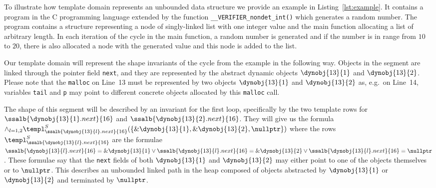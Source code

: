 {To illustrate how template domain represents an unbounded data structure we provide an example in Listing~\ref{lst:example}.
It contains a program in the C programming language
extended by the function \lstinline{__VERIFIER_nondet_int()} which generates a random number.
The program contains a structure representing a node of singly-linked list
with one integer value and the main function allocating a list of arbitrary length.
In each iteration of the cycle in the main function, a random number is generated and if the number is in range
from $10$ to $20$, there is also allocated a node with the generated value
and this node is added to the list.
%

Our template domain will represent the shape invariants of the cycle from the example in the following way.
Objects in the segment are linked through the pointer field \texttt{next}, and
they are represented by the abstract dynamic objects $\dynobj{13}{1}$ and
$\dynobj{13}{2}$.
Please note that the \texttt{malloc} on Line~13 must be represented by two objects
$\dynobj{13}{1}$ and $\dynobj{13}{2}$ as, e.g.\ on Line~14, variables
\texttt{tail} and \texttt{p} may point to different concrete objects allocated
by this \texttt{malloc} call.

%
The shape of this segment will be described by an
invariant for the first loop, specifically by the two template rows for
$\ssalb{\dynobj{13}{1}.next}{16}$ and $\ssalb{\dynobj{13}{2}.next}{16}$.
%
They will give us the formula $\wedge_{l=1,2}
\templ^S_{\ssalb{\dynobj{13}{l}.next}{16}}(\{\&\dynobj{13}{1}, \&\dynobj{13}{2},
\nullptr\})$ where the rows $\templ^S_{\ssalb{\dynobj{13}{l}.next}{16}}$ are the
formulae $\ssalb{\dynobj{13}{l}.next}{16} = \&\dynobj{13}{1} \vee
\ssalb{\dynobj{13}{l}.next}{16} = \&\dynobj{13}{2} \vee
\ssalb{\dynobj{13}{l}.next}{16} = \nullptr$.
%
These formulae say that the \texttt{next} fields of both $\dynobj{13}{1}$ and
$\dynobj{13}{2}$ may either point to one of the objects themselves or to
$\nullptr$.
%
This describes an unbounded linked path in the heap composed of
objects abstracted by $\dynobj{13}{1}$ or $\dynobj{13}{2}$ and terminated by
$\nullptr$.


}
